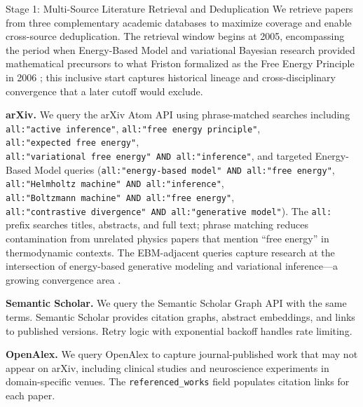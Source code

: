 \documentclass[
  ignorenonframetext,
]{beamer}
\author{\texorpdfstring{}{}}
\date{}
\begin{document}
\begin{frame}[fragile]{Stage 1: Multi-Source Literature Retrieval and
Deduplication \label{sec:methods_retrieval}}
\protect{}\label{stage-1-multi-source-literature-retrieval-and-deduplication}
We retrieve papers from three complementary academic databases to
maximize coverage and enable cross-source deduplication. The retrieval
window begins at 2005, encompassing the period when Energy-Based Model
and variational Bayesian research
\citep{dayan1995helmholtz, lecun2006tutorial} provided mathematical
precursors to what Friston formalized as the Free Energy Principle in
2006 \citep{friston2006free}; this inclusive start captures historical
lineage and cross-disciplinary convergence that a later cutoff would
exclude.

\textbf{arXiv.} We query the arXiv Atom API using phrase-matched
searches including \texttt{all:"active\ inference"},
\texttt{all:"free\ energy\ principle"},
\texttt{all:"expected\ free\ energy"},
\texttt{all:"variational\ free\ energy"\ AND\ all:"inference"}, and
targeted Energy-Based Model queries
(\texttt{all:"energy-based\ model"\ AND\ all:"free\ energy"},
\texttt{all:"Helmholtz\ machine"\ AND\ all:"inference"},
\texttt{all:"Boltzmann\ machine"\ AND\ all:"free\ energy"},
\texttt{all:"contrastive\ divergence"\ AND\ all:"generative\ model"}).
The \texttt{all:} prefix searches titles, abstracts, and full text;
phrase matching reduces contamination from unrelated physics papers that
mention ``free energy'' in thermodynamic contexts. The EBM-adjacent
queries capture research at the intersection of energy-based generative
modeling and variational inference---a growing convergence area
\citep{lecun2006tutorial}.

\textbf{Semantic Scholar.} We query the Semantic Scholar Graph API
\citep{kinney2023semantic} with the same terms. Semantic Scholar
provides citation graphs, abstract embeddings, and links to published
versions. Retry logic with exponential backoff handles rate limiting.

\textbf{OpenAlex.} We query OpenAlex \citep{priem2022openalex} to
capture journal-published work that may not appear on arXiv, including
clinical studies and neuroscience experiments in domain-specific venues.
The \texttt{referenced\_works} field populates citation links for each
paper.


\end{frame}
\end{document}

